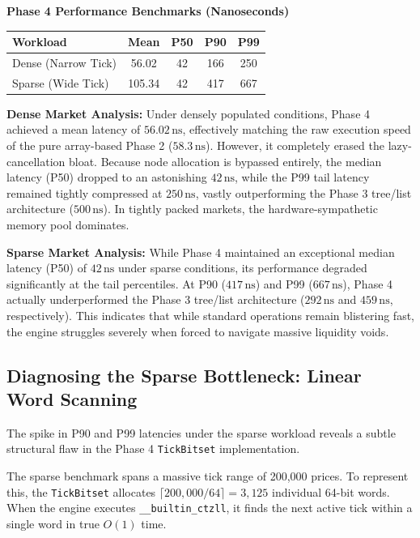 \documentclass{article}
\begin{document}
\vspace{0.3cm}
\begin{center}
\textbf{Phase 4 Performance Benchmarks (Nanoseconds)}
\vspace{0.1cm}

\begin{tabular}{|l|c|c|c|c|}
\hline
\textbf{Workload} & \textbf{Mean} & \textbf{P50} & \textbf{P90} & \textbf{P99} \\
\hline
Dense (Narrow Tick) & 56.02 & 42 & 166 & 250 \\
Sparse (Wide Tick)  & 105.34 & 42 & 417 & 667 \\
\hline
\end{tabular}
\end{center}
\vspace{0.3cm}

\textbf{Dense Market Analysis:} 
Under densely populated conditions, Phase 4 achieved a mean latency of $56.02\,\text{ns}$, effectively matching the raw execution speed of the pure array-based Phase 2 ($58.3\,\text{ns}$). However, it completely erased the lazy-cancellation bloat. Because node allocation is bypassed entirely, the median latency (P50) dropped to an astonishing $42\,\text{ns}$, while the P99 tail latency remained tightly compressed at $250\,\text{ns}$, vastly outperforming the Phase 3 tree/list architecture ($500\,\text{ns}$). In tightly packed markets, the hardware-sympathetic memory pool dominates.

\textbf{Sparse Market Analysis:} 
While Phase 4 maintained an exceptional median latency (P50) of $42\,\text{ns}$ under sparse conditions, its performance degraded significantly at the tail percentiles. At P90 ($417\,\text{ns}$) and P99 ($667\,\text{ns}$), Phase 4 actually underperformed the Phase 3 tree/list architecture ($292\,\text{ns}$ and $459\,\text{ns}$, respectively). This indicates that while standard operations remain blistering fast, the engine struggles severely when forced to navigate massive liquidity voids.

\subsection{Diagnosing the Sparse Bottleneck: Linear Word Scanning}

The spike in P90 and P99 latencies under the sparse workload reveals a subtle structural flaw in the Phase 4 \texttt{TickBitset} implementation. 

The sparse benchmark spans a massive tick range of 200,000 prices. To represent this, the \texttt{TickBitset} allocates $\lceil 200,000 / 64 \rceil = 3,125$ individual 64-bit words. When the engine executes \texttt{\_\_builtin\_ctzll}, it finds the next active tick within a single word in true $O(1)$ time. 
\end{document}
